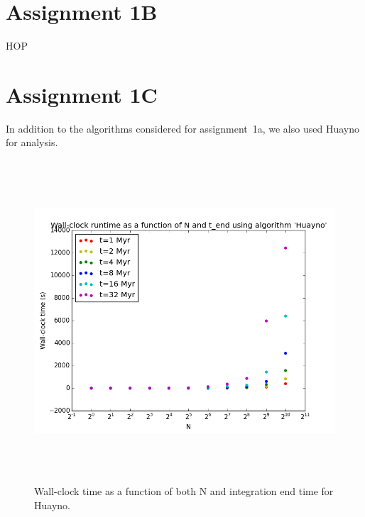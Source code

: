 \documentclass[a4paper]{article}
\begin{document}
\section*{Assignment 1B} 
HOP \citep{1998ApJ...498..137E}

\section*{Assignment 1C}
In addition to the algorithms considered for assignment~1a, we also used Huayno \citep{2012NewA...17..711P} for analysis.

\begin{figure}[h!]
\begin{center}
\includegraphics[height=12cm]{../GravitationalDynamics/plots/CA_GD_TLRH_s1603221_SS_s1617451_Huayno_runtime.png}
\caption{Wall-clock time as a function of both N and integration end time for Huayno.}
\label{fig:Huayno_runtime}
\end{center}
\end{figure}
\end{document}
